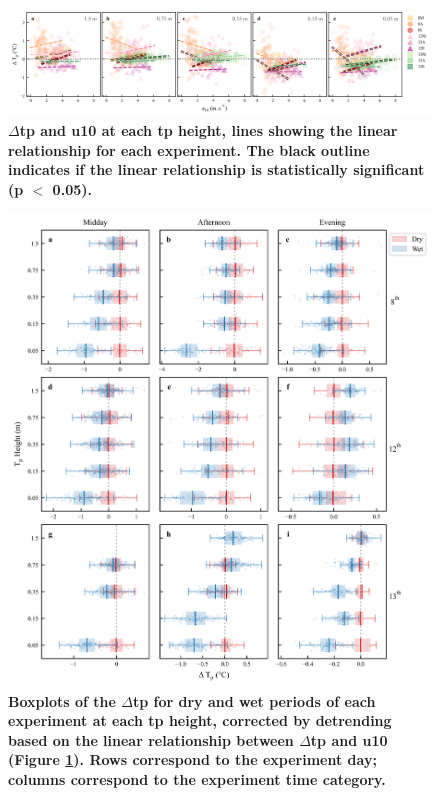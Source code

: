 \documentclass[final,3p,times,authoryear]{elsarticle}
\begin{document}
\begin{figure}
\centering
\includegraphics[trim={0 0 0 0},clip,scale=0.6]{wind_differences_relationship.png}
\caption{\bf $\Delta$\gls{tp} and \gls{u10} at each \gls{tp} height, lines showing the linear relationship for each experiment. The black outline indicates if the linear relationship is statistically significant (\gls{p} $<$ 0.05).}
 \label{fig:7.12}
\end{figure}






\begin{figure}
\centering
\includegraphics[trim={0 0 0 0},clip,scale=1.0]{temp_profile_box_plot_wind.png}
\caption{\bf Boxplots of the $\Delta$\gls{tp} for dry and wet periods of each experiment at each \gls{tp} height, corrected by detrending based on the linear relationship between $\Delta$\gls{tp} and \gls{u10} (Figure \ref{fig:7.12}). Rows correspond to the experiment day; columns correspond to the experiment time category.}
 \label{fig:7.13}
\end{figure}
\end{document}
